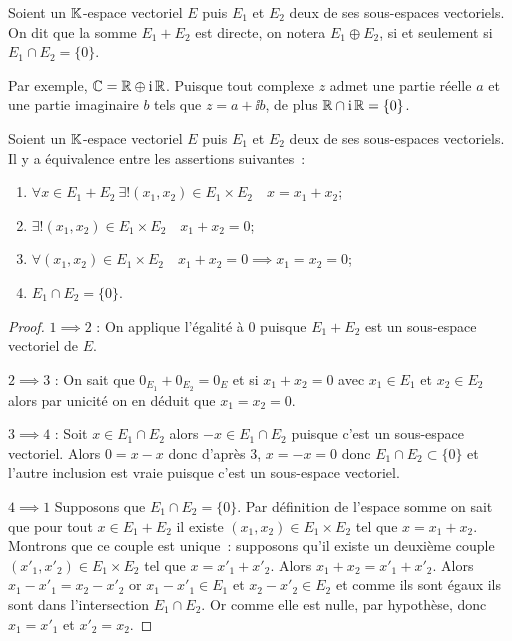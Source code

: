 \begin{defdef}
  Soient un \(\mathbb{K}\)-espace vectoriel \(E\) puis \(E_1\) et \(E_2\) deux de ses 
  sous-espaces vectoriels. On dit que la somme \(E_1+E_2\) est directe, on 
  notera \(E_1 \oplus E_2\), si et seulement si \(E_1 \cap E_2 =\{0\}\).
\end{defdef}

Par exemple, \(\mathbb{C}=\mathbb{R} \oplus \operatorname{i}\mathbb{R}\). Puisque tout complexe \(z\) admet une 
partie réelle \(a\) et une partie imaginaire \(b\) tels que \(z=a+\ii b\), de 
plus \(\mathbb{R}\cap \operatorname{i} \mathbb{R}=\{0\}\).

\begin{theo}\label{theo:caracSommeDirecte}
  Soient un \(\mathbb{K}\)-espace vectoriel \(E\) puis \(E_1\) et \(E_2\) deux de ses 
  sous-espaces vectoriels. Il y a équivalence entre les assertions suivantes~:
  \begin{enumerate}
    \item \(\forall x \in E_1+E_2 \ \exists! (x_1,x_2) \in E_1 \times E_2 \quad 
      x=x_1+x_2\);
    \item \(\exists! (x_1,x_2) \in E_1\times E_2 \quad x_1+x_2=0\);
    \item \(\forall (x_1,x_2) \in E_1\times E_2 \quad x_1+x_2=0 \implies 
      x_1=x_2=0\);
    \item \(E_1 \cap E_2 = \{0\}\).
  \end{enumerate}
\end{theo}
\begin{proof}
  \(1 \implies 2\) : On applique l'égalité à \(0\) puisque \(E_1+E_2\) est un 
  sous-espace vectoriel de \(E\).

  \(2 \implies 3\) : On sait que \(0_{E_1}+0_{E_2}=0_E\) et si \(x_1+x_2=0\) 
  avec \(x_1\in E_1\) et \(x_2\in E_2\) alors par unicité on en déduit que 
  \(x_1=x_2=0\).

  \(3 \implies 4\) : Soit \(x \in E_1 \cap E_2\) alors \(-x \in E_1 \cap E_2\) 
  puisque c'est un sous-espace vectoriel. Alors \(0=x-x\) donc d'après \(3\), 
  \(x=-x=0\) donc \(E_1 \cap E_2 \subset \{0\}\) et l'autre inclusion est vraie 
  puisque c'est un sous-espace vectoriel.

  \(4 \implies 1\) Supposons que \(E_1 \cap E_2 = \{0\}\). Par définition de 
  l'espace somme on sait que pour tout \(x \in E_1+E_2\) il existe \((x_1,x_2) 
  \in E_1 \times E_2\) tel que \(x=x_1+x_2\). Montrons que ce couple est 
  unique~: supposons qu'il existe un deuxième couple \((x'_1,x'_2) \in E_1 
  \times E_2\) tel que \(x=x'_1+x'_2\). Alors \(x_1+x_2=x'_1+x'_2\). Alors 
  \(x_1-x'_1=x_2-x'_2\) or \(x_1 -x'_1 \in E_1\) et \(x_2-x'_2 \in E_2\)  et 
  comme ils sont égaux ils sont dans l'intersection \(E_1 \cap E_2\). Or comme 
  elle est nulle, par hypothèse, donc \(x_1=x'_1\) et \(x'_2=x_2\).
\end{proof}

